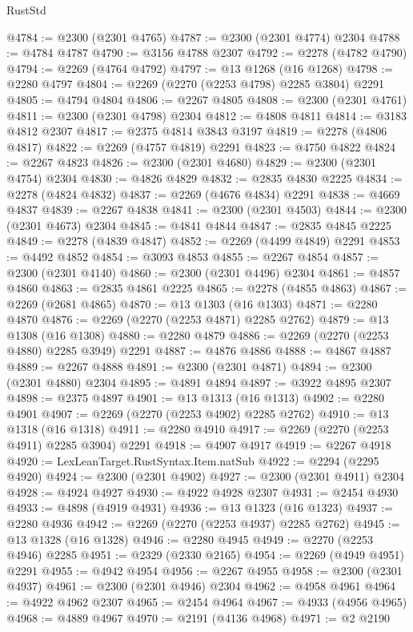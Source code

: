 \begin{lexlean}{RustStd}
\begin{coremodule}
@4784 := @2300 (@2301 @4765)
@4787 := @2300 (@2301 @4774) @2304
@4788 := @4784 @4787
@4790 := @3156 @4788 @2307
@4792 := @2278 (@4782 @4790)
@4794 := @2269 (@4764 @4792)
@4797 := @13 @1268 (@16 @1268)
@4798 := @2280 @4797
@4804 := @2269 (@2270 (@2253 @4798) @2285 @3804) @2291
@4805 := @4794 @4804
@4806 := @2267 @4805
@4808 := @2300 (@2301 @4761)
@4811 := @2300 (@2301 @4798) @2304
@4812 := @4808 @4811
@4814 := @3183 @4812 @2307
@4817 := @2375 @4814 @3843 @3197
@4819 := @2278 (@4806 @4817)
@4822 := @2269 (@4757 @4819) @2291
@4823 := @4750 @4822
@4824 := @2267 @4823
@4826 := @2300 (@2301 @4680)
@4829 := @2300 (@2301 @4754) @2304
@4830 := @4826 @4829
@4832 := @2835 @4830 @2225
@4834 := @2278 (@4824 @4832)
@4837 := @2269 (@4676 @4834) @2291
@4838 := @4669 @4837
@4839 := @2267 @4838
@4841 := @2300 (@2301 @4503)
@4844 := @2300 (@2301 @4673) @2304
@4845 := @4841 @4844
@4847 := @2835 @4845 @2225
@4849 := @2278 (@4839 @4847)
@4852 := @2269 (@4499 @4849) @2291
@4853 := @4492 @4852
@4854 := @3093 @4853
@4855 := @2267 @4854
@4857 := @2300 (@2301 @4140)
@4860 := @2300 (@2301 @4496) @2304
@4861 := @4857 @4860
@4863 := @2835 @4861 @2225
@4865 := @2278 (@4855 @4863)
@4867 := @2269 (@2681 @4865)
@4870 := @13 @1303 (@16 @1303)
@4871 := @2280 @4870
@4876 := @2269 (@2270 (@2253 @4871) @2285 @2762)
@4879 := @13 @1308 (@16 @1308)
@4880 := @2280 @4879
@4886 := @2269 (@2270 (@2253 @4880) @2285 @3949) @2291
@4887 := @4876 @4886
@4888 := @4867 @4887
@4889 := @2267 @4888
@4891 := @2300 (@2301 @4871)
@4894 := @2300 (@2301 @4880) @2304
@4895 := @4891 @4894
@4897 := @3922 @4895 @2307
@4898 := @2375 @4897
@4901 := @13 @1313 (@16 @1313)
@4902 := @2280 @4901
@4907 := @2269 (@2270 (@2253 @4902) @2285 @2762)
@4910 := @13 @1318 (@16 @1318)
@4911 := @2280 @4910
@4917 := @2269 (@2270 (@2253 @4911) @2285 @3904) @2291
@4918 := @4907 @4917
@4919 := @2267 @4918
@4920 := LexLeanTarget.RustSyntax.Item.natSub
@4922 := @2294 (@2295 @4920)
@4924 := @2300 (@2301 @4902)
@4927 := @2300 (@2301 @4911) @2304
@4928 := @4924 @4927
@4930 := @4922 @4928 @2307
@4931 := @2454 @4930
@4933 := @4898 (@4919 @4931)
@4936 := @13 @1323 (@16 @1323)
@4937 := @2280 @4936
@4942 := @2269 (@2270 (@2253 @4937) @2285 @2762)
@4945 := @13 @1328 (@16 @1328)
@4946 := @2280 @4945
@4949 := @2270 (@2253 @4946) @2285
@4951 := @2329 (@2330 @2165)
@4954 := @2269 (@4949 @4951) @2291
@4955 := @4942 @4954
@4956 := @2267 @4955
@4958 := @2300 (@2301 @4937)
@4961 := @2300 (@2301 @4946) @2304
@4962 := @4958 @4961
@4964 := @4922 @4962 @2307
@4965 := @2454 @4964
@4967 := @4933 (@4956 @4965)
@4968 := @4889 @4967
@4970 := @2191 (@4136 @4968)
@4971 := @2 @2190

\end{coremodule}
\end{lexlean}
